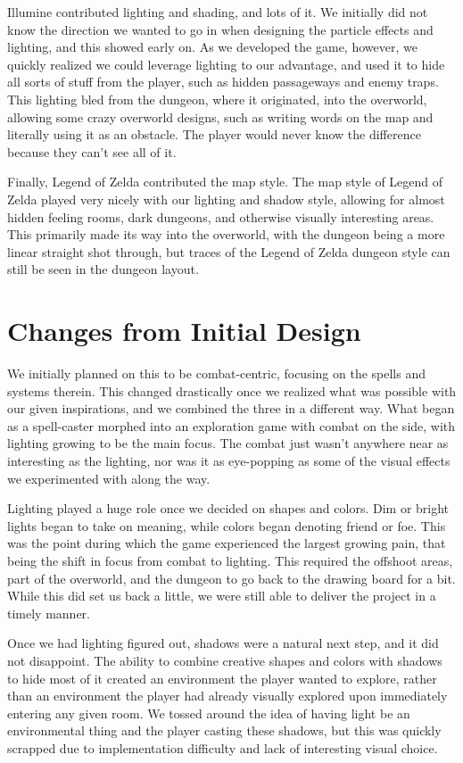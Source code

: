 \documentclass{sigchi}
\begin{document}
Illumine contributed lighting and shading, and lots of it.  We initially did not know the direction we wanted to go in when designing the particle effects and lighting, and this
showed early on.  As we developed the game, however, we quickly realized we could leverage lighting to our advantage, and used it to hide all sorts of stuff from the player, such
as hidden passageways and enemy traps.  This lighting bled from the dungeon, where it originated, into the overworld, allowing some crazy overworld designs, such as writing words on the map and literally using it as an obstacle.  The player would never know the difference because they can't see all of it.

Finally, Legend of Zelda contributed the map style.  The map style of Legend of Zelda played very nicely with our lighting and shadow style, allowing for almost hidden feeling rooms,
dark dungeons, and otherwise visually interesting areas.  This primarily made its way into the overworld, with the dungeon being a more linear straight shot through, but traces of the Legend of Zelda dungeon style can still be seen in the dungeon layout.

\section{Changes from Initial Design}
We initially planned on this to be combat-centric, focusing on the spells and systems therein.  This changed drastically once we realized what was possible with our given inspirations, and we combined the three in a different way.  What began as a spell-caster morphed into an exploration game with combat on the side, with lighting growing to be the main focus.  The combat just wasn't anywhere near as interesting as the lighting, nor was it as eye-popping as some of the visual effects we experimented with along the way.

Lighting played a huge role once we decided on shapes and colors.  Dim or bright lights began to take on meaning, while colors began denoting friend or foe.  This was the point during which the game experienced the largest growing pain, that being the shift in focus from combat to lighting.  This required the offshoot areas, part of the overworld, and the dungeon to go back to the drawing board for a bit.  While this did set us back a little, we were still able to deliver the project in a timely manner.

Once we had lighting figured out, shadows were a natural next step, and it did not disappoint.  The ability to combine creative shapes and colors with shadows to hide most of it created an environment the player wanted to explore, rather than an environment the player had already visually explored upon immediately entering any given room.  We tossed around the idea of having light be an environmental thing and the player casting these shadows, but this was quickly scrapped due to implementation difficulty and lack of interesting visual choice.
\end{document}
